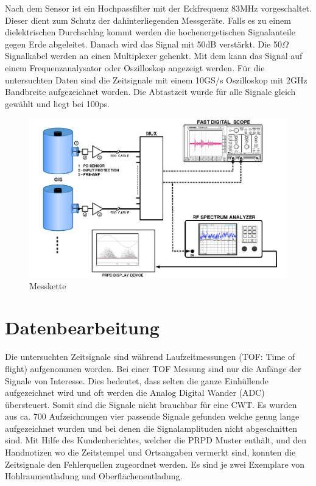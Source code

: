 \begin{refsection}
Nach dem Sensor ist ein Hochpassfilter mit der Eckfrequenz 83MHz vorgeschaltet.
Dieser dient zum Schutz der dahinterliegenden Messgeräte.
Falls es zu einem dielektrischen Durchschlag kommt werden die hochenergetischen Signalanteile gegen Erde abgeleitet.
Danach wird das Signal mit 50dB verstärkt.
Die 50$\Omega$ Signalkabel werden an einen Multiplexer gehenkt. 
Mit dem kann das Signal auf einem Frequenzanalysator oder Oszilloskop angezeigt werden. 
Für die untersuchten Daten sind die Zeitsignale mit einem 10GS/s Oszilloskop mit 2GHz Bandbreite aufgezeichnet worden.
Die Abtastzeit wurde für alle Signale gleich gewählt und liegt bei 100ps. 
\begin{figure}
	\centering
	\includegraphics[width=0.5\linewidth]{papers/gis/Bilder/MessketteAusGIS}
	\caption{Messkette \cite{report:ABBOnSite}}
	\label{fig:messketteausgis}
\end{figure}

 
\section{Datenbearbeitung}

Die untersuchten Zeitsignale sind während Laufzeitmessungen (TOF: Time of flight) aufgenommen worden. 
Bei einer TOF Messung sind nur die Anfänge der Signale von Interesse.
Dies bedeutet, dass selten die ganze Einhüllende aufgezeichnet wird und oft werden die Analog Digital Wander (ADC) übersteuert. 
Somit sind die Signale nicht brauchbar für eine CWT.
Es wurden aus ca. 700 Aufzeichnungen vier passende Signale gefunden welche genug lange aufgezeichnet wurden und bei denen die Signalamplituden nicht abgeschnitten sind. 
Mit Hilfe des Kundenberichtes, welcher die PRPD Muster enthält, und den Handnotizen wo die Zeitstempel und Ortsangaben vermerkt sind, konnten die Zeitsignale den Fehlerquellen zugeordnet werden.
Es sind je zwei Exemplare von Hohlraumentladung und Oberflächenentladung.
\begin{figure}
	\centering
	

\end{figure}
\end{refsection}

